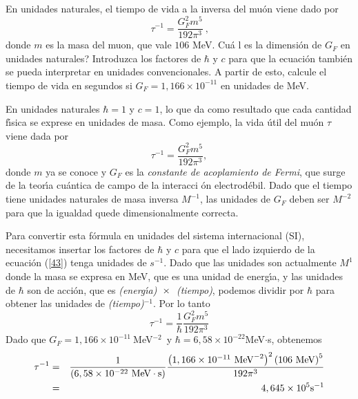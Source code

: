 \begin{exercise}
En unidades naturales, el tiempo de vida a la inversa del mu\'{o}n viene dado por
\begin{equation}
\tau ^{-1}=\frac{G_{F}^{2}m^{5}}{192\pi ^{3}}~\text{,}  \label{43}
\end{equation}%
donde $m$ es la masa del muon, que vale $106$ MeV. \textquestiondown Cu\'{a}%
l es la dimensi\'{o}n de $G_{F}$ en unidades naturales? Introduzca los
factores de $\hbar $ y $c$ para que la ecuaci\'{o}n tambi\'{e}n se pueda
interpretar en unidades convencionales. A partir de esto, calcule el tiempo
de vida en segundos si $G_{F}=1,166\times 10^{-11}$ en unidades de MeV.
\end{exercise}
\begin{solution}
En unidades naturales $\hbar =1$  y $c=1$, lo que da como resultado que cada
cantidad f\'{\i}sica se exprese en unidades de masa. Como ejemplo, la vida 
\'{u}til del mu\'{o}n $\tau $ viene dada por 
\begin{equation*}
\tau ^{-1}=\frac{G_{F}^{2}m^{5}}{192\pi ^{3}},
\end{equation*}%
donde $m$ ya se conoce y $G_{F}$ es la \emph{constante de acoplamiento de
Fermi}, que surge de la teor\'{\i}a cu\'{a}ntica de campo de la interacci%
\'{o}n electrod\'{e}bil. Dado que el tiempo tiene unidades naturales de masa
inversa $M^{-1}$, las unidades de $G_{F}$ deben ser $M^{-2}$ para que la
igualdad quede dimensionalmente correcta.

Para convertir esta f\'{o}rmula en unidades del sistema internacional (SI),
necesitamos insertar los factores de $\hbar $ y $c$ para que el lado
izquierdo de la ecuaci\'{o}n (\ref{43}) tenga unidades de $s^{-1}$. Dado que
las unidades son actualmente $M^{1}$ donde la masa se expresa en MeV, que es
una unidad de energ\'{\i}a, y las unidades de $\hbar $ son de acci\'{o}n,
que es \emph{(energ\'{\i}a)}$\emph{\ }\times \emph{\ }$\emph{(tiempo)},
podemos dividir por $\hbar $ para obtener las unidades de \emph{(tiempo)}$%
^{-1}$. Por lo tanto%
\begin{equation*}
\tau ^{-1}=\frac{1}{\hbar }\frac{G_{F}^{2}m^{5}}{192\pi ^{3}}
\end{equation*}%
Dado que $G_{F}=1,166\times 10^{-11}~$MeV$^{-2}$~y $\hbar =6,58\times
10^{-22}$MeV$\cdot $s, obtenemos%
\begin{eqnarray}
\tau ^{-1} &=&\frac{1}{\left( 6,58\times 10^{-22}~\text{MeV}\cdot \text{s}%
\right) }\frac{\left( 1,166\times 10^{-11}~\text{MeV}^{-2}\right) ^{2}\left(
106~\text{MeV}\right) ^{5}}{192\pi ^{3}}  \notag \\
&=&4,645\times 10^{5}\text{s}^{-1}  \label{43a}
\end{eqnarray}%


\end{solution}
